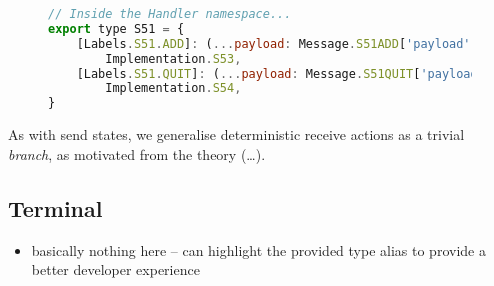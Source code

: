 \begin{figure}[!ht]
\begin{lstlisting}[language=javascript,tabsize=2]
// Inside the Handler namespace...
export type S51 = {
	[Labels.S51.ADD]: (...payload: Message.S51ADD['payload']) =>
		Implementation.S53,
	[Labels.S51.QUIT]: (...payload: Message.S51QUIT['payload']) => 
		Implementation.S54,
}
\end{lstlisting}
\end{figure}

As with send states,
we generalise deterministic receive actions as a trivial \textit{branch}, 
as motivated from the theory (\dots).

\subsection{Terminal}
\begin{itemize}
\item basically nothing here -- can highlight the provided type alias to provide a better developer experience
\end{itemize}